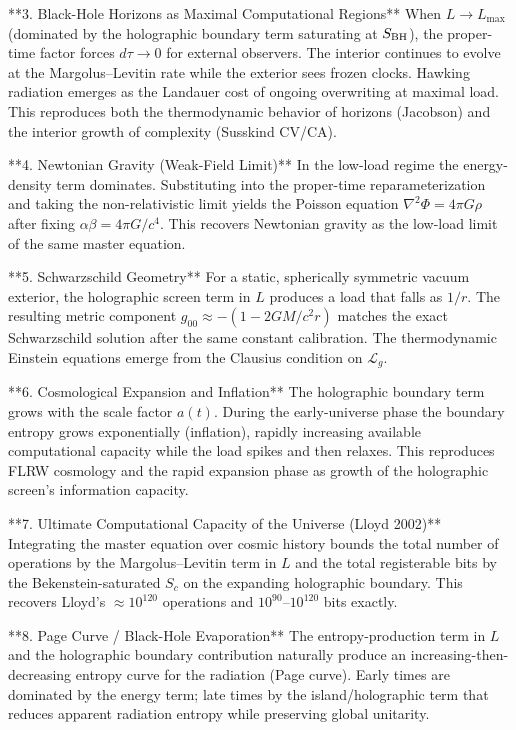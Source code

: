 \documentclass[reprint,amsmath,amssymb,aps,prd,preprintnumbers,superscriptaddress,longbibliography,10pt]{revtex4-2}
\begin{document}
**3. Black-Hole Horizons as Maximal Computational Regions**  
When $L \to L_{\max}$ (dominated by the holographic boundary term saturating at $S_{\rm BH}$), the proper-time factor forces $d\tau \to 0$ for external observers. The interior continues to evolve at the Margolus–Levitin rate while the exterior sees frozen clocks. Hawking radiation emerges as the Landauer cost of ongoing overwriting at maximal load. This reproduces both the thermodynamic behavior of horizons (Jacobson) and the interior growth of complexity (Susskind CV/CA).

**4. Newtonian Gravity (Weak-Field Limit)**  
In the low-load regime the energy-density term dominates. Substituting into the proper-time reparameterization and taking the non-relativistic limit yields the Poisson equation $\nabla^2 \Phi = 4\pi G \rho$ after fixing $\alpha \beta = 4\pi G / c^4$. This recovers Newtonian gravity as the low-load limit of the same master equation.

**5. Schwarzschild Geometry**
For a static, spherically symmetric vacuum exterior, the holographic screen term in $L$ produces a load that falls as $1/r$. The resulting metric component $g_{00} \approx -(1 - 2GM/c^2 r)$ matches the exact Schwarzschild solution after the same constant calibration. The thermodynamic Einstein equations emerge from the Clausius condition on $\mathcal{L}_g$.

**6. Cosmological Expansion and Inflation**  
The holographic boundary term grows with the scale factor $a(t)$. During the early-universe phase the boundary entropy grows exponentially (inflation), rapidly increasing available computational capacity while the load spikes and then relaxes. This reproduces FLRW cosmology and the rapid expansion phase as growth of the holographic screen’s information capacity.

**7. Ultimate Computational Capacity of the Universe (Lloyd 2002)**  
Integrating the master equation over cosmic history bounds the total number of operations by the Margolus–Levitin term in $L$ and the total registerable bits by the Bekenstein-saturated $S_c$ on the expanding holographic boundary. This recovers Lloyd’s $\approx 10^{120}$ operations and $10^{90}$–$10^{120}$ bits exactly.

**8. Page Curve / Black-Hole Evaporation**  
The entropy-production term in $L$ and the holographic boundary contribution naturally produce an increasing-then-decreasing entropy curve for the radiation (Page curve). Early times are dominated by the energy term; late times by the island/holographic term that reduces apparent radiation entropy while preserving global unitarity.
\end{document}
